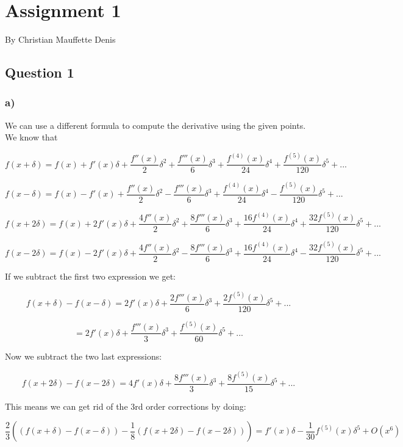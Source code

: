 \documentclass[
]{article}
\author{}
\date{}
\begin{document}
\hypertarget{assignment-1}{%
\section{Assignment 1}\label{assignment-1}}

By Christian Mauffette Denis

\hypertarget{question-1}{%
\subsection{Question 1}\label{question-1}}

\hypertarget{a}{%
\subsubsection{a)}\label{a}}

We can use a different formula to compute the derivative using the given
points. We know that

\[f(x + \delta) = f(x) + f'(x) \delta + \frac{f''(x)}{2}\delta^2 + \frac{f'''(x)}{6}\delta^3 + \frac{f^{(4)}(x)}{24}\delta^4 + \frac{f^{(5)}(x)}{120}\delta^5 + ...  \]

\[f(x - \delta) = f(x) - f'(x) + \frac{f''(x)}{2}\delta^2 - \frac{f'''(x)}{6}\delta^3 + \frac{f^{(4)}(x)}{24}\delta^4 - \frac{f^{(5)}(x)}{120}\delta^5 + ...  \]

\[f(x + 2\delta) = f(x) + 2 f'(x) \delta + \frac{4 f''(x)}{2}\delta^2 + \frac{8 f'''(x)}{6}\delta^3 + \frac{16 f^{(4)}(x)}{24}\delta^4 + \frac{32 f^{(5)}(x)}{120}\delta^5 + ...  \]

\[f(x - 2\delta) = f(x) - 2 f'(x) \delta + \frac{4 f''(x)}{2}\delta^2 - \frac{8 f'''(x)}{6}\delta^3 + \frac{16 f^{(4)}(x)}{24}\delta^4 - \frac{32 f^{(5)}(x)}{120}\delta^5 + ...  \]

If we subtract the first two expression we get:

\[f(x + \delta) - f(x - \delta) = 2 f'(x) \delta + \frac{ 2 f'''(x)}{6}\delta^3 + \frac{2 f^{(5)}(x)}{120}\delta^5 + ...  \]

\[ = 2 f'(x) \delta + \frac{ f'''(x)}{3}\delta^3 + \frac{ f^{(5)}(x)}{60}\delta^5 + ...  \]

Now we subtract the two last expressions:

\[ f(x + 2\delta) - f(x - 2\delta) = 4 f'(x) \delta  + \frac{8 f'''(x)}{3}\delta^3 + \frac{8 f^{(5)}(x)}{15}\delta^5 + ...  \]

This means we can get rid of the 3rd order corrections by doing:

\[\frac{2}{3} \left((f(x + \delta)-f(x-\delta ))-\frac{1}{8} (f(x + 2 \delta)-f(x-2 \delta ))\right) = f'(x)\delta -\frac{1}{30} f^{(5)}(x) \delta^5 + O\left(x^6\right)\]
\end{document}
